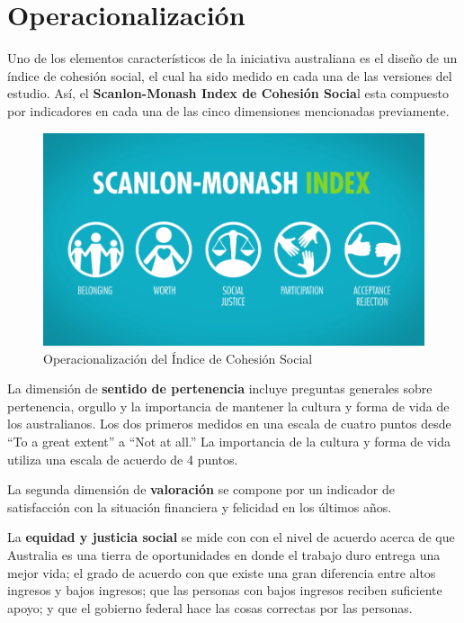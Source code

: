 \documentclass[
  12pt,
]{book}
\begin{document}
\hypertarget{operacionalizaciuxf3n-1}{%
\section{Operacionalización}\label{operacionalizaciuxf3n-1}}

Uno de los elementos característicos de la iniciativa australiana es el diseño de un índice de cohesión social, el cual ha sido medido en cada una de las versiones del estudio. Así, el \textbf{Scanlon-Monash Index de Cohesión Socia}l esta compuesto por indicadores en cada una de las cinco dimensiones mencionadas previamente.

\begin{figure}[H]

{\centering \includegraphics[width=0.75\linewidth]{inputs/images/scalon} 

}

\caption{Operacionalización del Índice de Cohesión Social}\label{fig:scalon}
\end{figure}

La dimensión de \textbf{sentido de pertenencia} incluye preguntas generales sobre pertenencia, orgullo y la importancia de mantener la cultura y forma de vida de los australianos. Los dos primeros medidos en una escala de cuatro puntos desde ``To a great extent'' a ``Not at all.'' La importancia de la cultura y forma de vida utiliza una escala de acuerdo de 4 puntos.

La segunda dimensión de \textbf{valoración} se compone por un indicador de satisfacción con la situación financiera y felicidad en los últimos años.

La \textbf{equidad y justicia social} se mide con con el nivel de acuerdo acerca de que Australia es una tierra de oportunidades en donde el trabajo duro entrega una mejor vida; el grado de acuerdo con que existe una gran diferencia entre altos ingresos y bajos ingresos; que las personas con bajos ingresos reciben suficiente apoyo; y que el gobierno federal hace las cosas correctas por las personas.
\end{document}
